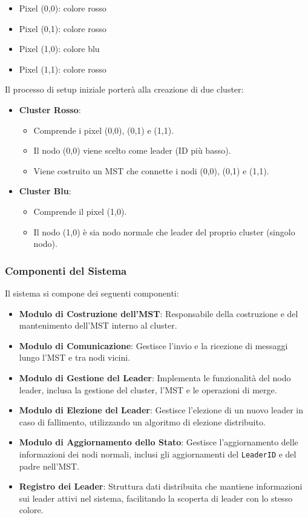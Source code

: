 \documentclass[12pt, a4paper]{report}
\begin{document}
\begin{itemize}
    \item Pixel (0,0): colore rosso
    \item Pixel (0,1): colore rosso
    \item Pixel (1,0): colore blu
    \item Pixel (1,1): colore rosso
\end{itemize}

Il processo di setup iniziale porterà alla creazione di due cluster:

\begin{itemize}
    \item \textbf{Cluster Rosso}:
    \begin{itemize}
        \item Comprende i pixel (0,0), (0,1) e (1,1).
        \item Il nodo (0,0) viene scelto come leader (ID più basso).
        \item Viene costruito un MST che connette i nodi (0,0), (0,1) e (1,1).
    \end{itemize}
    \item \textbf{Cluster Blu}:
    \begin{itemize}
        \item Comprende il pixel (1,0).
        \item Il nodo (1,0) è sia nodo normale che leader del proprio cluster (singolo nodo).
    \end{itemize}
\end{itemize}

\subsubsection{Componenti del Sistema}

Il sistema si compone dei seguenti componenti:

\begin{itemize}
    \item \textbf{Modulo di Costruzione dell'MST}: Responsabile della costruzione e del mantenimento dell'MST interno al cluster.
    \item \textbf{Modulo di Comunicazione}: Gestisce l'invio e la ricezione di messaggi lungo l'MST e tra nodi vicini.
    \item \textbf{Modulo di Gestione del Leader}: Implementa le funzionalità del nodo leader, inclusa la gestione del cluster, l'MST e le operazioni di merge.
    \item \textbf{Modulo di Elezione del Leader}: Gestisce l'elezione di un nuovo leader in caso di fallimento, utilizzando un algoritmo di elezione distribuito.
    \item \textbf{Modulo di Aggiornamento dello Stato}: Gestisce l'aggiornamento delle informazioni dei nodi normali, inclusi gli aggiornamenti del \texttt{LeaderID} e del padre nell'MST.
    \item \textbf{Registro dei Leader}: Struttura dati distribuita che mantiene informazioni sui leader attivi nel sistema, facilitando la scoperta di leader con lo stesso colore.
\end{itemize}
\end{document}
